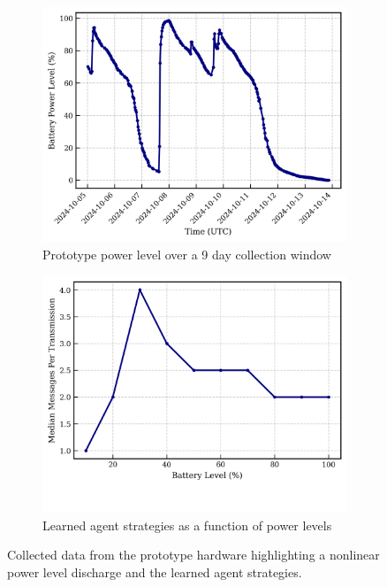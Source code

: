 \documentclass[10pt]{cai}
\begin{document}
\begin{figure}[h]
  \centering
  \begin{subfigure}{0.48\textwidth}
      \centering
      \includegraphics[width=\linewidth]{figs/prototype_power_level.png}
      \caption{Prototype power level over a 9 day collection window}
      \label{fig:prototype_power}
  \end{subfigure}
  \hfill
  \begin{subfigure}{0.48\textwidth}
      \centering
      \includegraphics[width=\linewidth]{figs/battery_level_vs_collection_ratio.png}
      \caption{Learned agent strategies as a function of power levels}
      \label{fig:battery_vs_collection}
  \end{subfigure}
  \caption{Collected data from the prototype hardware highlighting a nonlinear power level discharge and the learned agent strategies.}
  \label{fig:prototype_result}
\end{figure}
\end{document}

